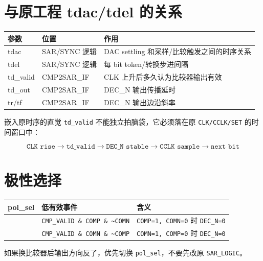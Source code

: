 \documentclass[11pt,a4paper,UTF8]{ctexart}
\begin{document}
\section{与原工程 tdac/tdel 的关系}

\begin{center}
\begin{tabularx}{\textwidth}{>{\ttfamily}l l X}
\toprule
\textbf{参数} & \textbf{位置} & \textbf{作用} \\
\midrule
tdac & SAR/SYNC 逻辑 & DAC settling 和采样/比较触发之间的时序关系 \\
tdel & SAR/SYNC 逻辑 & 每 bit token/转换步进间隔 \\
td\_valid & CMP2SAR\_IF & CLK 上升后多久认为比较器输出有效 \\
td\_out & CMP2SAR\_IF & DEC\_N 输出传播延时 \\
tr/tf & CMP2SAR\_IF & DEC\_N 输出边沿斜率 \\
\bottomrule
\end{tabularx}
\end{center}

\begin{notebox}{嵌入原时序的直觉}
\texttt{td\_valid} 不能独立拍脑袋，它必须落在原 \texttt{CLK/CCLK/SET} 的时间窗口中：

\[
\texttt{CLK rise}
\rightarrow
\texttt{td\_valid}
\rightarrow
\texttt{DEC\_N stable}
\rightarrow
\texttt{CCLK sample}
\rightarrow
\texttt{next bit}
\]
\end{notebox}

\section{极性选择}

\begin{center}
\begin{tabularx}{0.9\textwidth}{>{\ttfamily}l X X}
\toprule
\textbf{pol\_sel} & \textbf{低有效事件} & \textbf{含义} \\
\midrule
0 & \texttt{CMP\_VALID \& COMP \& \textasciitilde COMN} & \texttt{COMP=1, COMN=0} 时 \texttt{DEC\_N=0} \\
1 & \texttt{CMP\_VALID \& COMN \& \textasciitilde COMP} & \texttt{COMN=1, COMP=0} 时 \texttt{DEC\_N=0} \\
\bottomrule
\end{tabularx}
\end{center}

如果换比较器后输出方向反了，优先切换 \texttt{pol\_sel}，不要先改原 \texttt{SAR\_LOGIC}。
\end{document}
